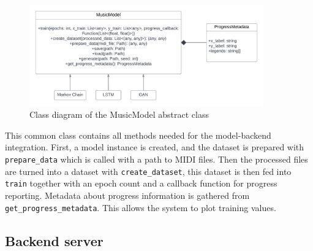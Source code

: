 \documentclass[a4paper, 11pt, twoside]{report}
\theoremstyle{definition}
\begin{document}
\begin{figure}[H]
    \centering
    \includegraphics[width=0.9\textwidth]{class_models.png}
    \caption{Class diagram of the MusicModel abstract class}
    \label{fig:musicmodel_class_diagram}
\end{figure}

This common class contains all methods needed for the model-backend integration. First, a model instance is created, and the dataset is prepared with \texttt{prepare\_data} which is called with a path to MIDI files. Then the processed files are turned into a dataset with \texttt{create\_dataset}, this dataset is then fed into \texttt{train} together with an epoch count and a callback function for progress reporting. Metadata about progress information is gathered from \texttt{get\_progress\_metadata}. This allows the system to plot training values. \par

\subsection{Backend server}
\end{document}

